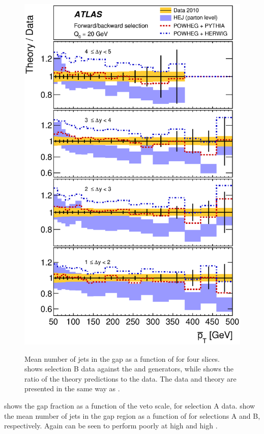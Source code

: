 \begin{figure}[htpb]
{    \includegraphics[width=\smallfigwidth]{chapters/gbj/Njet_PtBarDist_gap_Q0_sel_B_Ratio.eps}
    \label{fig:gbj:N_jets_pTbar_B_ratio}}
  \caption{Mean number of jets in the gap as a function of \pTbar for four \DeltaY
           slices. \protect{} shows selection
           B data against the \HEJ and \Powheg generators, while \protect{}
           shows the ratio of the theory predictions to the data. The data and theory
           are presented in the same way as .}
  \label{fig:gbj:N_jets_pTbar_B}
\end{figure}

 shows the gap fraction as a function of
the veto scale, \Qnought for selection A data.  show the mean
number of jets in the gap region as a function of \pTbar for selections A and B,
respectively. Again \HEJ can be seen to perform poorly at high \pTbar and high
\DeltaY.

